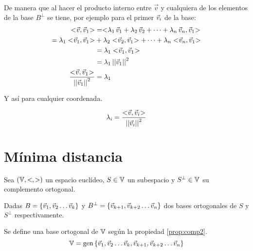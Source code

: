 De manera que al hacer el producto interno entre $\Vec{v}$ y cualquiera de los elementos de la base $B^\perp$ se tiene, por ejemplo para el primer $\Vec{v}_i$ de la base:
\begin{align*}
    \intProd{\Vec{v}}{\Vec{v}_1} &= \intProd{\lambda_1 \, \Vec{v}_1 + \lambda_2 \, \Vec{v}_2 + \dots + \lambda_\nth \, \Vec{v}_\nth}{\Vec{v}_1}
    \\
    = \lambda_1 \intProd{\Vec{v}_1}{\Vec{v}_1} &+ \lambda_2 \intProd{\Vec{v}_2}{\Vec{v}_1} + \dots + \lambda_\nth \intProd{\Vec{v}_\nth}{\Vec{v}_1}
    \\
    &= \lambda_1 \intProd{\Vec{v}_1}{\Vec{v}_1}
    \\
    &= \lambda_1 \, \nnorm{\Vec{v}_1}^2
    \\
    \frac{\intProd{\Vec{v}}{\Vec{v}_1}}{\nnorm{\Vec{v}_1}^2}&= \lambda_1
\end{align*}

Y así para cualquier coordenada.

\begin{mdframed}[style=PropertyFrame]
    \begin{prop}
        \label{prop:orto3}
    \end{prop}
    \begin{equation*}
        \lambda_i = \frac{<\hspace{-0.8mm}\Vec{v},\Vec{v}_i\hspace{-0.8mm}>}{{\left|\left| {\Vec{v}_i} \right|\right|}^2}
    \end{equation*}
\end{mdframed}


\section{Mínima distancia}

Sea $(\mathbb{V}, <\hspace{-0.8mm}\,,\,\hspace{-0.8mm}>)$ un espacio euclídeo, $S\in\mathbb{V}$ un subespacio y $S^\perp\in\mathbb{V}$ su complemento ortogonal.

Dadas $B={ \left\{ {\Vec{v}_1 , \Vec{v}_2 \dots \Vec{v}_k} \right\} }$ y $B^\perp = { \left\{ {\Vec{v}_{k+1} , \Vec{v}_{k+2} \dots \Vec{v}_n} \right\} }$ dos bases ortogonales de $S$ y $S^\perp$ respectivamente.

Se define una base ortogonal de $\mathbb{V}$ según la propiedad \ref{prop:comp2}.
\begin{equation*}
    \mathbb{V} = \operatorname{gen} { \left\{ {\Vec{v}_1 , \Vec{v}_2 \dots \Vec{v}_k , \Vec{v}_{k+1} , \Vec{v}_{k+2} \dots \Vec{v}_n} \right\} }
\end{equation*}

